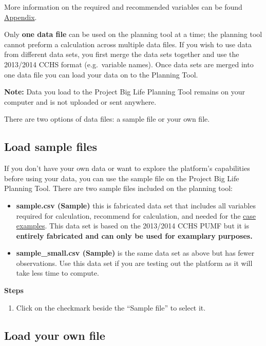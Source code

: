 \documentclass[]{book}
\providecommand{\tightlist}{%
  \setlength{\itemsep}{0pt}\setlength{\parskip}{0pt}}
\begin{document}
More information on the required and recommended variables can be found \protect\hyperlink{mport}{Appendix}.

Only \textbf{one data file} can be used on the planning tool at a time; the planning tool cannot preform a calculation across multiple data files. If you wish to use data from different data sets, you first merge the data sets together and use the 2013/2014 CCHS format (e.g.~variable names). Once data sets are merged into one data file you can load your data on to the Planning Tool.

\textbf{Note:} Data you load to the Project Big Life Planning Tool remains on your computer and is not uploaded or sent anywhere.

There are two options of data files: a sample file or your own file.

\hypertarget{load-sample-files}{%
\subsection{Load sample files}\label{load-sample-files}}

If you don't have your own data or want to explore the platform's capabilities before using your data, you can use the sample file on the Project Big Life Planning Tool. There are two sample files included on the planning tool:

\begin{itemize}
\tightlist
\item
  \textbf{sample.csv (Sample)} this is fabricated data set that includes all variables required for calculation, recommend for calculation, and needed for the \protect\hyperlink{caseexamples}{case examples}. This data set is based on the 2013/2014 CCHS PUMF but it is \textbf{entirely fabricated and can only be used for examplary purposes.}
\item
  \textbf{sample\_small.csv (Sample)} is the same data set as above but has fewer observations. Use this data set if you are testing out the platform as it will take less time to compute.
\end{itemize}

\textbf{Steps}

\begin{enumerate}
\def\labelenumi{\arabic{enumi}.}
\tightlist
\item
  Click on the checkmark beside the ``Sample file'' to select it.
\end{enumerate}

\hypertarget{load-your-own-file}{%
\subsection{Load your own file}\label{load-your-own-file}}
\end{document}
